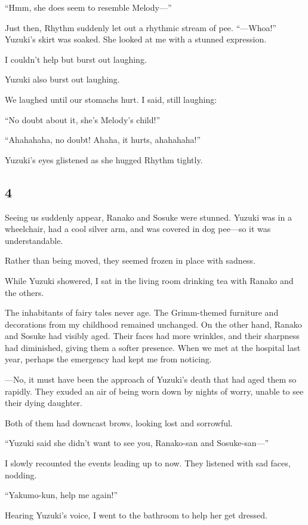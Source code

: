 \documentclass[
    a4paper,
    12pt,
    twoside,
    openany,
    UTF8,
    fontset=windows
]{ctexbook}
\begin{document}
``Hmm, she does seem to resemble Melody---''

Just then, Rhythm suddenly let out a rhythmic stream of pee. ``---Whoa!'' Yuzuki's skirt was soaked. She looked at me with a stunned expression.

I couldn't help but burst out laughing.

Yuzuki also burst out laughing.

We laughed until our stomachs hurt. I said, still laughing:

``No doubt about it, she's Melody's child!''

``Ahahahaha, no doubt! Ahaha, it hurts, ahahahaha!''

Yuzuki's eyes glistened as she hugged Rhythm tightly.


\subsection*{4}

Seeing us suddenly appear, Ranako and Sosuke were stunned. Yuzuki was in a wheelchair, had a cool silver arm, and was covered in dog pee—so it was understandable.

Rather than being moved, they seemed frozen in place with sadness.

While Yuzuki showered, I sat in the living room drinking tea with Ranako and the others.

The inhabitants of fairy tales never age. The Grimm-themed furniture and decorations from my childhood remained unchanged. On the other hand, Ranako and Sosuke had visibly aged. Their faces had more wrinkles, and their sharpness had diminished, giving them a softer presence. When we met at the hospital last year, perhaps the emergency had kept me from noticing.

---No, it must have been the approach of Yuzuki's death that had aged them so rapidly. They exuded an air of being worn down by nights of worry, unable to see their dying daughter.

Both of them had downcast brows, looking lost and sorrowful.

``Yuzuki said she didn't want to see you, Ranako-san and Sosuke-san---''

I slowly recounted the events leading up to now. They listened with sad faces, nodding.

``Yakumo-kun, help me again!''

Hearing Yuzuki's voice, I went to the bathroom to help her get dressed.
\end{document}
